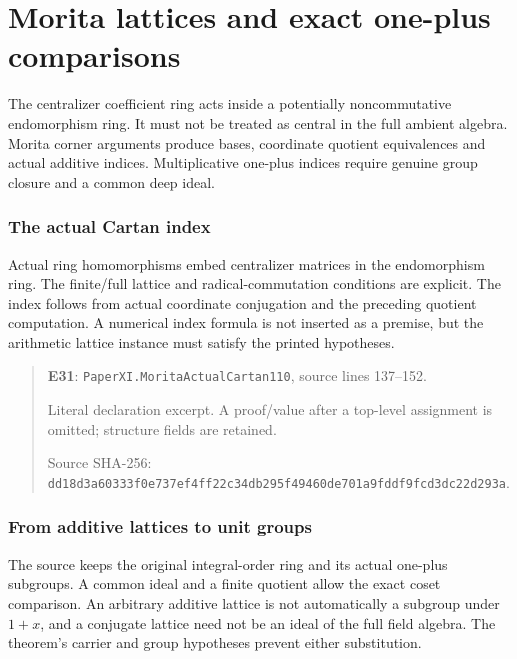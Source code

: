 \documentclass[10pt,oneside]{book}
\begin{document}
\chapter{Morita lattices and exact one-plus comparisons}
The centralizer coefficient ring acts inside a potentially noncommutative endomorphism ring. It must not be treated as central in the full ambient algebra. Morita corner arguments produce bases, coordinate quotient equivalences and actual additive indices. Multiplicative one-plus indices require genuine group closure and a common deep ideal.

\subsection{The actual Cartan index}
\label{guide:E31}
Actual ring homomorphisms embed centralizer matrices in the endomorphism ring. The finite/full lattice and radical-commutation conditions are explicit.
The index follows from actual coordinate conjugation and the preceding quotient computation. A numerical index formula is not inserted as a premise, but the arithmetic lattice instance must satisfy the printed hypotheses.

\begin{quote}\footnotesize\textbf{E31}: \nolinkurl{PaperXI.MoritaActualCartan110}, source lines 137--152.\par Literal declaration excerpt. A proof/value after a top-level assignment is omitted; structure fields are retained.\par Source SHA-256: {\scriptsize\texttt{dd18d3a60333f0e737ef4ff22c34db295f49460de701a9fddf9fcd3dc22d293a}}.\end{quote}


\subsection{From additive lattices to unit groups}
\label{guide:E32}
The source keeps the original integral-order ring and its actual one-plus subgroups. A common ideal and a finite quotient allow the exact coset comparison.
An arbitrary additive lattice is not automatically a subgroup under \(1+x\), and a conjugate lattice need not be an ideal of the full field algebra. The theorem's carrier and group hypotheses prevent either substitution.
\end{document}
